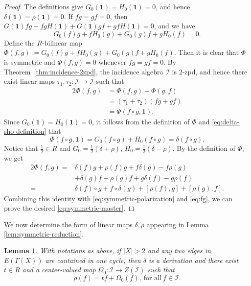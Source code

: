 \documentclass[reqno]{amsart}
\numberwithin{equation}{section}
\theoremstyle{plain}
\newtheorem{lemma}[theorem]{Lemma}
\theoremstyle{definition}
\newcommand{\I}{\mathcal I}
\newcommand{\one}{\mathbf 1}
\begin{document}
\begin{proof}
The definitions give $G_0(\one)=H_0(\one)=0$, and hence $\delta(\one)=\rho(\one)=0$.
If $fg=gf=0$, then $G(\one)fg+fgH(\one)+G(\one)gf+gfH(\one)=0$, and we have
$$G_0(f)g+fH_0(g)+G_0(g)f+gH_0(f)=0.$$
Define the $R$-bilinear map $\Phi(f,g):=G_0(f)g+fH_0(g)+G_0(g)f+gH_0(f)$.
Then it is clear that $\Phi$ is symmetric and $\Phi(f,g)=0$ whenever $fg=gf=0$.
By Theorem~\ref{thm:incidence-2zpd}, the incidence algebra $\I$ is $2$-zpd, and hence there exist linear maps
$\tau_1,\tau_2:\I \to \I$ such that
\begin{align}
2\Phi(f,g)&=\Phi(f,g)+\Phi(g,f)\nonumber\\
&=(\tau_1+\tau_2)(fg+gf)\nonumber\\
&=\Phi(f\circ g,\one)\label{eq:symmetric-polarization}.
\end{align}
Since $G_0(\one)=H_0(\one)=0$, it follows from the definition of $\Phi$ and \eqref{eq:delta-rho-definition} that
\begin{equation}\label{eq:fg}
\Phi(f\circ g,\one)=G_0(f\circ g)+H_0(f\circ g)=\delta(f\circ g).
\end{equation}
Notice that $\frac{1}{2}\in R$ and $G_0=\frac{1}{2}(\delta+\rho)$,
$H_0=\frac{1}{2}(\delta-\rho)$. By the definition of $\Phi$, we get
\[
\begin{aligned}
2\Phi(f,g)
={}&\delta(f)g+\rho(f)g
+f\delta(g)-f\rho(g)\\
&+\delta(g)f+\rho(g)f
+g\delta(f)-g\rho(f)\\
={}&\delta(f)\circ g+f\circ\delta(g)
+[\rho(f),g]+[\rho(g),f].
\end{aligned}
\]
Combining this identity with \eqref{eq:symmetric-polarization} and \eqref{eq:fg}, we can prove the desired
\eqref{eq:symmetric-master}.
\end{proof}

We now determine the form of linear maps $\delta,\rho$ appearing in Lemma \ref{lem:symmetric-reduction}.

\begin{lemma}\label{lem:symmetric-master-structure}
With notations as above, if $|X|>2$ and any two edges in $E(\Gamma(X))$ are contained in one cycle,
then $\delta$ is a derivation and
there exist $t\in R$ and a center-valued map
$\Omega_0:\I\to Z(\I)$ such that
\begin{equation}\label{eq:rho-structure}
\rho(f)=tf+\Omega_0(f),~\text{for~all}~f\in\I.
\end{equation}
\end{lemma}
\end{document}
